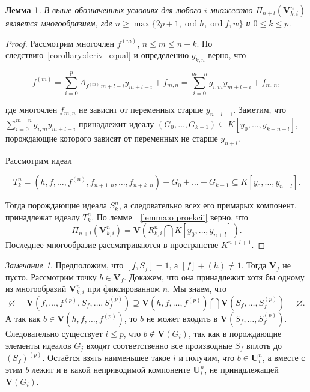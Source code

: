 \documentclass[16pt]{article}
\DeclareMathOperator{\ord}{ord}
\theoremstyle{plain1}
\newtheorem{lemma}[theorem1]{Лемма}
\theoremstyle{plain2}
\theoremstyle{plain}
\theoremstyle{plain3}
\theoremstyle{definition}
\theoremstyle{remark}
\newtheorem*{remark*}{Замечание}
\begin{document}
\begin{lemma} \label{lemma:o_ideale}
 В выше обозначенных условиях для любого $i$ множество $\Pi_{n+l}(\mathbf{V}_{k,i}^n)$ является многообразием, где $n \geqslant\max\{ 2p+1,\ord{h},\ord{f},w\}$ и  $0\leqslant k\leqslant p$.
\end{lemma}

\begin{proof}
Рассмотрим многочлен $ f^{(m)}$, $n\leqslant m\leqslant n+k$. По следствию~\ref{corollary:deriv_equal} и определению $g_{k,n}$ верно, что

$$
f^{(m)}= \sum\limits_{i=0}^{p} A_{f^{(m)}\,m+l -i}y_{m+l -i} + f_{m,n}=\sum\limits_{i=0}^{m-n} g_{i,m}y_{m+l -i} + f_{m,n},
$$

где многочлен $f_{m,n}$ не зависит от переменных старше $y_{n+l-1}$. Заметим, что $\sum\limits_{i=0}^{m-n} g_{i,m}y_{m+l -i}$ принадлежит идеалу  $(G_0,\ldots, G_{k-1})\subseteq K[y_0,\ldots,y_{k+n+l}]$,  порождающие которого зависят от переменных не старше $y_{n+l}$.

Рассмотрим идеал

$$
T_k^n=(h,f,\ldots,f^{(n)},f_{n+1,n},\ldots,f_{n+k,n}) + G_0+\ldots+ G_{k-1}\subseteq K[y_0,\ldots,y_{n+l}].
$$

Тогда порождающие идеала $S_k^n$, а следовательно всех его примарых компонент, принадлежат идеалу $T_k^n$. По лемме~~\ref{lemma:o proekcii} верно, что
$$
\Pi_{n+l}(\mathbf{V}_{k,i}^n)=\mathbf{V}(R_{k,i}^n\bigcap K[y_0,\ldots,y_{n+l}]).
$$
Последнее многообразие рассматриваются в пространстве $K^{n+l+1}$.
\end{proof}


\begin{remark*}\label{remark:o_prinadleznosti_reshenia}
Предположим, что $[f,S_f]=1$, а $[f]+(h)\neq 1$. Тогда $\mathbf{V}_{f}$ не пусто. Рассмотрим точку $b\in\mathbf{V}_{f}$. Докажем, что она принадлежит хотя бы одному из многообразий $\mathbf{V}_{k,i}^n$ при фиксированном $n$. Мы знаем, что 
$$
\varnothing=\mathbf{V}(f,\ldots,f^{(p)},S_f,\ldots,S_f^{(p)})\supseteq \mathbf{V}(h,f,\ldots,f^{(p)})\bigcap\mathbf{V}(S_f,\ldots,S_f^{(p)})=\varnothing.
$$
 А так как $b\in \mathbf{V}(h,f,\ldots,f^{(p)})$, то $b$ не может входить в $\mathbf{V}(S_f,\ldots,S_f^{(p)})$. Следовательно существует $i\leqslant p$, что $b \not\in \mathbf{V}(G_i)$, так как  в порождающие элементы идеалов $G_j$ входят соответственно все производные $S_f$ вплоть до $(S_f)^{(p)}$. Остаётся взять наименьшее такое $i$ и получим, что $b\in \mathbf{U}_{i}^n$, а вместе с этим $b$ лежит и в какой неприводимой компоненте $\mathbf{U}_{i}^n$, не принадлежащей $\mathbf{V}(G_{i})$.
\end{remark*}
\end{document}
